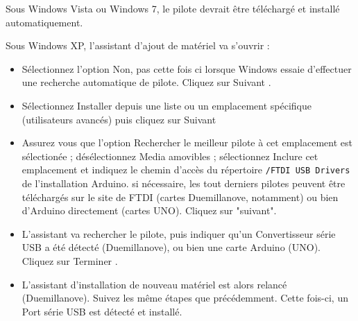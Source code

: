 \documentclass[a4paper,12pt]{article}
\newcommand{\code}[1]{\texttt{#1}}
\begin{document}
Sous Windows Vista ou Windows 7, le pilote devrait être téléchargé et installé
automatiquement.

Sous Windows XP, l'assistant d'ajout de matériel va s'ouvrir :

\begin{itemize}
        \item 

                Sélectionnez l'option \og Non, pas cette fois ci \fg lorsque Windows
                essaie d'effectuer une recherche automatique de pilote. Cliquez sur \og
                Suivant \fg.
        
        \item 

                Sélectionnez \og Installer depuis une liste ou un emplacement
                spécifique (utilisateurs avancés) \fg puis cliquez sur \og Suivant \fg


        \item

                Assurez vous que l'option \og Rechercher le meilleur pilote à cet
                emplacement \fg est sélectionée ; désélectionnez \og Media amovibles
                \fg; sélectionnez \og Inclure cet emplacement \fg et indiquez le chemin
                d'accès du répertoire \code{/FTDI USB Drivers} de l'installation
                Arduino.  si nécessaire, les tout derniers pilotes peuvent être
                téléchargés sur le site de FTDI (cartes Duemillanove, notamment) ou
                bien d'Arduino directement (cartes UNO).  Cliquez sur "suivant".
        
        \item

                L'assistant va rechercher le pilote, puis indiquer qu'un \og
                Convertisseur série USB \fg a été détecté (Duemillanove), ou bien une
                carte Arduino (UNO). Cliquez sur \og Terminer \fg.
        
        \item
                L'assistant d'installation de nouveau matériel est alors relancé
                (Duemillanove). Suivez les même étapes que précédemment. Cette fois-ci,
                un \og Port série USB \fg est détecté et installé.

\end{itemize}
\end{document}
